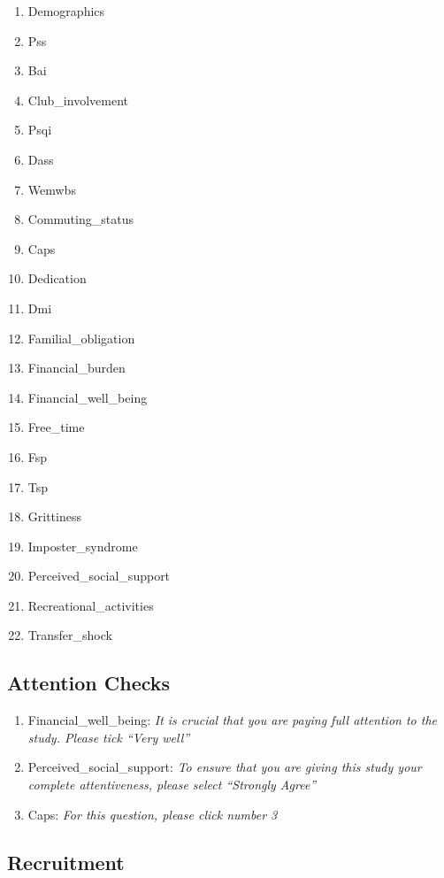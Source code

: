 \documentclass[]{book}
\providecommand{\tightlist}{%
  \setlength{\itemsep}{0pt}\setlength{\parskip}{0pt}}
\begin{document}
\begin{enumerate}
\def\labelenumi{\arabic{enumi}.}
\tightlist
\item
  Demographics
\item
  Pss
\item
  Bai
\item
  Club\_involvement 
\item
  Psqi
\item
  Dass
\item
  Wemwbs
\item
  Commuting\_status
\item
  Caps
\item
  Dedication
\item
  Dmi
\item
  Familial\_obligation
\item
  Financial\_burden
\item
  Financial\_well\_being
\item
  Free\_time
\item
  Fsp
\item
  Tsp
\item
  Grittiness
\item
  Imposter\_syndrome
\item
  Perceived\_social\_support
\item
  Recreational\_activities
\item
  Transfer\_shock
\end{enumerate}

\hypertarget{attention-checks}{%
\subsection{Attention Checks}\label{attention-checks}}

\begin{enumerate}
\def\labelenumi{\arabic{enumi}.}
\tightlist
\item
  Financial\_well\_being:
  \emph{It is crucial that you are paying full attention to the study. Please tick ``Very well''}
\item
  Perceived\_social\_support:
  \emph{To ensure that you are giving this study your complete attentiveness, please select ``Strongly Agree''}
\item
  Caps:
  \emph{For this question, please click number 3}
\end{enumerate}

\hypertarget{recruitment}{%
\subsection{Recruitment}\label{recruitment}}
\end{document}
